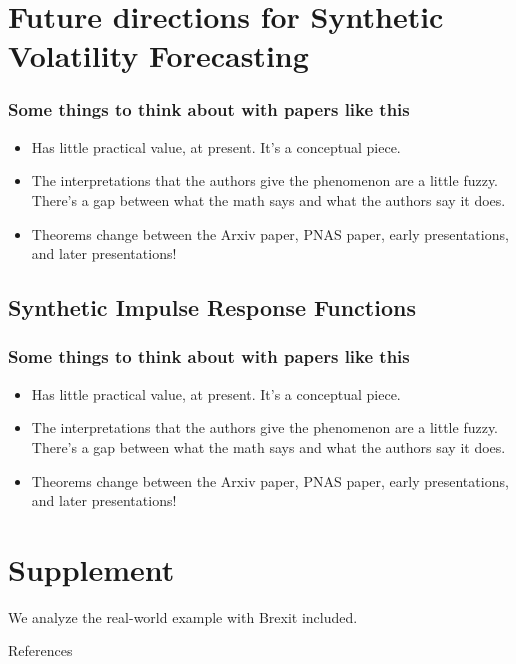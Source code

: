 \documentclass[pdf]{beamer}
\begin{document}
\section{Future directions for Synthetic Volatility Forecasting}

\begin{frame}
\frametitle{Some things to think about with papers like this}
\begin{itemize}
\item Has little practical value, at present.  It's a conceptual piece.
\item The interpretations that the authors give the phenomenon are a little fuzzy.  There's a gap between what the math says and what the authors say it does.
\item Theorems change between the Arxiv paper, PNAS paper, early presentations, and later presentations!
\end{itemize}
\end{frame}

\subsection{Synthetic Impulse Response Functions}

\begin{frame}
\frametitle{Some things to think about with papers like this}
\begin{itemize}
\item Has little practical value, at present.  It's a conceptual piece.
\item The interpretations that the authors give the phenomenon are a little fuzzy.  There's a gap between what the math says and what the authors say it does.
\item Theorems change between the Arxiv paper, PNAS paper, early presentations, and later presentations!
\end{itemize}
\end{frame}



\section{Supplement}
We analyze the real-world example with Brexit included.

\begin{frame}{References}
    
    
\end{frame}
\end{document}
